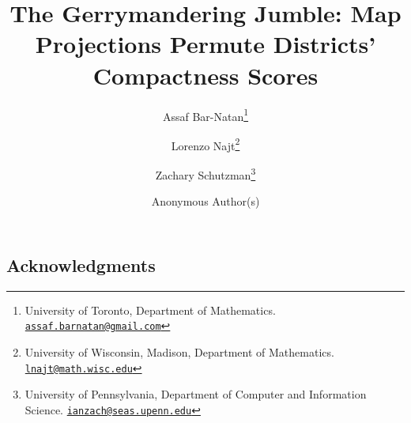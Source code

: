 \documentclass[11pt]{article}
\title{The Gerrymandering Jumble: Map Projections Permute Districts' Compactness Scores}
\author{Assaf Bar-Natan\thanks{University of Toronto, Department of Mathematics. \href{mailto:assaf.barnatan@gmail.com}{\texttt{assaf.barnatan@gmail.com}}} 
	\and Lorenzo Najt\thanks{University of Wisconsin, Madison, Department of Mathematics. \href{mailto:lnajt4@gmail.com}{\texttt{lnajt@math.wisc.edu}}}  
	\and Zachary Schutzman\thanks{University of Pennsylvania, Department of Computer and Information Science. \href{mailto:ianzach@seas.upenn.edu}{\texttt{ianzach@seas.upenn.edu}}}  }
\author{Anonymous Author(s)}
\theoremstyle{definition}
\theoremstyle{remark}
\newcommand{\mute}[1]{}
\begin{document}
\maketitle
\begin{abstract}
\noindent
\end{abstract}
\ifarxiv
\else
\fi









%




%



\ifarxiv
\subsection*{Acknowledgments}


\else
\mute{
\begin{acknowledgment}{Acknowledgments}

\end{acknowledgment}
}
\fi





%
\end{document}
